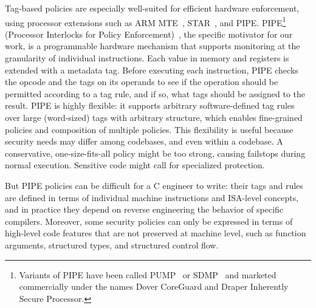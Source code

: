 Tag-based policies are especially well-suited for efficient hardware enforcement, using 
processor extensions such as ARM MTE~\cite{arm-mte},
STAR~\cite{Gollapudi+23}, and
PIPE.  PIPE\footnote{ Variants of PIPE have
been called PUMP~\cite{Dhawan+15} or %
SDMP~\cite{RoesslerD18}%
and marketed commercially under the names Dover CoreGuard and Draper Inherently Secure Processor.}
(Processor Interlocks for Policy Enforcement)~\cite{Azevedo+16,Azevedo+15},%
the specific motivator for our work, 
is a programmable hardware mechanism that supports monitoring 
at the granularity of individual instructions. 
Each value in memory and registers
is extended with a metadata tag. Before executing each instruction,
PIPE checks the opcode and the tags on its operands to see if the operation 
should be permitted according to a tag rule, and if so, what tags should be 
assigned to the result.
PIPE is highly flexible: it supports
arbitrary software-defined tag rules over large (word-sized) tags with arbitrary structure,
which enables fine-grained policies and composition of multiple policies. This flexibility 
is useful because security needs may differ among codebases,
and even within a codebase. A conservative, one-size-fits-all policy might be too strong,
causing failstops during normal execution. Sensitive code might call for specialized
protection.
 

But PIPE policies can be difficult for a C engineer to write: their tags and rules
are defined in terms of individual machine instructions and ISA-level
concepts, and in practice they depend on reverse engineering the behavior
of specific compilers. 
Moreover, some security policies can only be expressed in terms of high-level code
features that are not preserved at machine level, such as function
arguments, structured types, and structured control flow.

